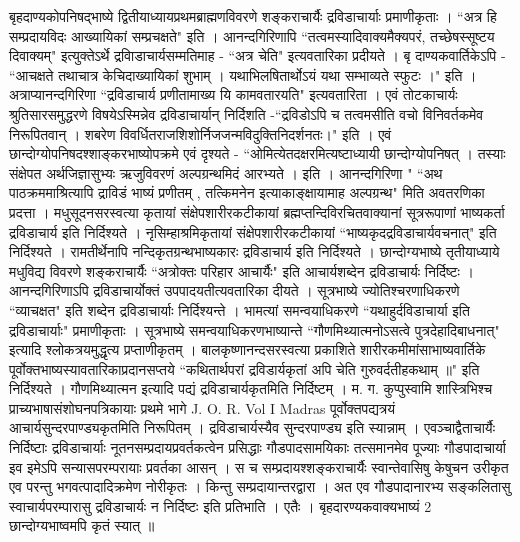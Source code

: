 बृहदाण्यकोपनिषद्भाष्ये द्वितीयाध्यायप्रथमब्राह्मणविवरणे शङ्कराचार्यैः द्रविडाचार्याः प्रमाणीकृताः । ``अत्र हि सम्प्रदायविदः आख्यायिकां सम्प्रचक्षते" इति । आनन्दगिरिणापि ``तत्वमस्यादिवाक्यमैक्यपरं, तच्छेषस्सूष्टय दिवाक्यम्" इत्युक्तेऽर्थे द्रविाडाचार्यसम्मतिमाह - ``अत्र चेति" इत्यवतारिका प्रदीयते । बृ दाण्यकवार्तिकेऽपि - ``आचक्षते तथाचात्र केचिदाख्यायिकां शुभाम् । यथाभिलषितार्थोऽयं यथा सम्भाव्यते स्फुटः ।" इति । अत्राप्यानन्दगिरिणा ``द्रविडाचार्य प्रणीतामाख्य यि कामवतारयति" इत्यवतारिता । एवं तोटकाचार्यः श्रुतिसारसमुद्धरणे विषयेऽस्मिन्नेव द्रविडाचार्यान् निर्दिशति -``द्रविडोऽपि च तत्वमसीति वचो विनिवर्तकमेव निरूपितवान् । शबरेण विवर्धितराजशिशोर्निजजन्मविदुक्तिनिदर्शनतः।" इति । एवं छान्दोग्योपनिषदश्शाङ्करभाष्योपक्रमे एवं दृश्यते - ``ओमित्येतदक्षरमित्यष्टाध्यायी छान्दोग्योपनिषत् । तस्याः संक्षेपत अर्थजिज्ञासुभ्यः ऋजुविवरणं अल्पग्रन्थमिदं आरभ्यते । इति । आनन्दगिरिणा " ``अथ पाठक्रममाश्रित्यापि द्राविडं भाष्यं प्रणीतम् , तत्किमनेन इत्याकाङ्क्षायामाह अल्पग्रन्थ" मिति अवतरणिका प्रदत्ता । मधुसूदनसरस्वत्या कृतायां संक्षेपशारीरकटीकायां ब्रह्मप्तन्दिविरचितवाक्यानां सूत्ररूपाणां भाष्यकर्ता द्रविडाचार्य इति निर्दिश्यते । नृसिम्हाश्रमिकृतायां संक्षेपशारीरकटीकायां ``भाष्यकृदद्रविडाचार्यवचनात्" इति निर्दिश्यते । रामतीर्थेनापि नन्दिकृतग्रन्थभाष्यकारः द्रविडाचार्य इति निर्दिश्यते । छान्दोग्यभाष्ये तृतीयाध्याये मधुविद्य विवरणे शङ्कराचार्यैः ``अत्रोक्तः परिहार आचार्यैः" इति आचार्यशब्देन द्रविडाचार्यः निर्दिष्टः । आनन्दगिरिणाऽपि द्रविडाचार्योक्तं उपपादयतीत्यवतारिका दीयते । सूत्रभाष्ये ज्योतिश्चरणाधिकरणे ``व्याचक्षत" इति शब्देन द्रविडाचार्याः निर्दिश्यन्ते । भामत्यां समन्वयाधिकरणे ``यथाहुर्दविडाचार्या इति द्रविडाचार्याः" प्रमाणीकृताः । सूत्रभाष्ये समन्वयाधिकरणभाष्यान्ते ``गौणमिथ्यात्मनोऽसत्वे पुत्रदेहादिबाधनात्" इत्यादि श्लोकत्रयमुद्धृत्य प्रप्ताणीकृतम् । बालकृष्णानन्दसरस्वत्या प्रकाशिते शारीरकमीमांसाभाष्यवार्तिके पूर्वोक्तभाष्यस्यावतारिकाप्रदानसप्तये ``कथितार्थपरां द्रविडार्यकृतां अपि चेति गुरुवर्दतीहकथाम् ॥" इति निर्दिश्यते । गौणमिथ्यात्मन इत्यादि पद्यं द्रविडाचार्यकृतमिति निर्दिष्टम् । म. ग. कुप्पुस्वामि शास्त्रिभिश्च प्राच्यभाषासंशोघनपत्रिकायाः प्रथमे भागे J. O. R. Vol I Madras पूर्वोक्तपद्यत्रयं आचार्यसुन्दरपाण्ड्यकृतमिति निरूपितम् । द्रविडाचार्यस्यैव सुन्दरपाण्ड्य इति स्यान्नाम् ।
एवञ्चाद्वैताचार्यैः निर्दिष्टाः द्रविडाचार्याः नूतनसम्प्रदायप्रवर्तकत्वेन प्रसिद्धाः गौडपादसामयिकाः तत्समानमेव पूज्याः गौडपादाचार्या इव इमेऽपि सन्यासपरम्परायाः प्रवर्तका आसन् । स च सम्प्रदायश्शङ्कराचार्यैः स्वान्तेवासिषु केषुचन उरीकृत एव परन्तु भगवत्पादादिक्रमेण नोरीकृतः । किन्तु सम्प्रदायान्तरद्वारा । अत एव गौडपादानारभ्य सङ्कलितासु स्वाचार्यपरम्पारासु द्रविडाचार्यः न निर्दिष्टः इति प्रतिभाति । एतैः । बृहदारण्यकवाक्यभाष्यं 2 छान्दोग्यभाष्वमपि कृतं स्यात् ॥

